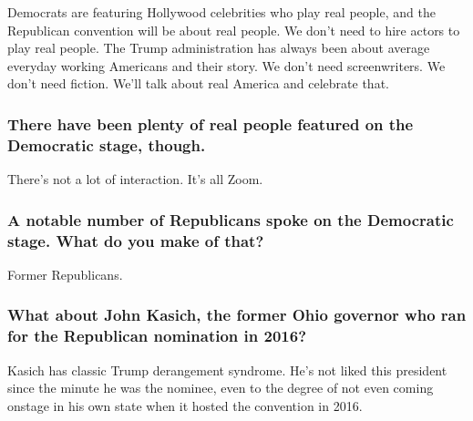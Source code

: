 Democrats are featuring Hollywood celebrities who play real people, and
the Republican convention will be about real people. We don't need to
hire actors to play real people. The Trump administration has always
been about average everyday working Americans and their story. We don't
need screenwriters. We don't need fiction. We'll talk about real America
and celebrate that.

\hypertarget{there-have-been-plenty-of-real-people-featured-on-the-democratic-stage-though}{%
\subsubsection{\texorpdfstring{\textbf{There have been plenty of real
people featured on the Democratic stage,
though.}}{There have been plenty of real people featured on the Democratic stage, though.}}\label{there-have-been-plenty-of-real-people-featured-on-the-democratic-stage-though}}

There's not a lot of interaction. It's all Zoom.

\hypertarget{a-notable-number-of-republicans-spoke-on-the-democratic-stage-what-do-you-make-of-that}{%
\subsubsection{\texorpdfstring{\textbf{A notable number of Republicans
spoke on the Democratic stage. What do you make of
that?}}{A notable number of Republicans spoke on the Democratic stage. What do you make of that?}}\label{a-notable-number-of-republicans-spoke-on-the-democratic-stage-what-do-you-make-of-that}}

Former Republicans.

\hypertarget{what-about-john-kasich-the-former-ohio-governor-who-ran-for-the-republican-nomination-in-2016}{%
\subsubsection{\texorpdfstring{\textbf{What about John Kasich, the
former Ohio governor who ran for the Republican nomination in
2016?}}{What about John Kasich, the former Ohio governor who ran for the Republican nomination in 2016?}}\label{what-about-john-kasich-the-former-ohio-governor-who-ran-for-the-republican-nomination-in-2016}}

Kasich has classic Trump derangement syndrome. He's not liked this
president since the minute he was the nominee, even to the degree of not
even coming onstage in his own state when it hosted the convention in
2016.

